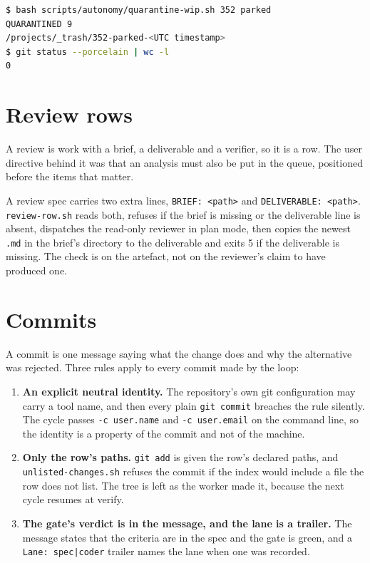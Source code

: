 \begin{lstlisting}[language=bash]
$ bash scripts/autonomy/quarantine-wip.sh 352 parked
QUARANTINED 9
/projects/_trash/352-parked-<UTC timestamp>
$ git status --porcelain | wc -l
0
\end{lstlisting}

\section{Review rows}

A review is work with a brief, a deliverable and a verifier, so it is a row. The user
directive behind it was that an analysis must also be put in the queue, positioned before the
items that matter.

A review spec carries two extra lines, \texttt{BRIEF: <path>} and \texttt{DELIVERABLE:
<path>}. \texttt{review-row.sh} reads both, refuses if the brief is missing or the deliverable
line is absent, dispatches the read-only reviewer in plan mode, then copies the newest
\texttt{.md} in the brief's directory to the deliverable and exits 5 if the deliverable is
missing. The check is on the artefact, not on the reviewer's claim to have produced one.

\section{Commits}

A commit is one message saying what the change does and why the alternative was rejected.
Three rules apply to every commit made by the loop:

\begin{enumerate}
	\item \textbf{An explicit neutral identity.} The repository's own git configuration may
	carry a tool name, and then every plain \texttt{git commit} breaches the rule silently. The
	cycle passes \texttt{-c user.name} and \texttt{-c user.email} on the command line, so the
	identity is a property of the commit and not of the machine.
	\item \textbf{Only the row's paths.} \texttt{git add} is given the row's declared paths,
	and \texttt{unlisted-changes.sh} refuses the commit if the index would include a file the
	row does not list. The tree is left as the worker made it, because the next cycle resumes
	at verify.
	\item \textbf{The gate's verdict is in the message, and the lane is a trailer.} The message
	states that the criteria are in the spec and the gate is green, and a \texttt{Lane:
	spec|coder} trailer names the lane when one was recorded.
\end{enumerate}


